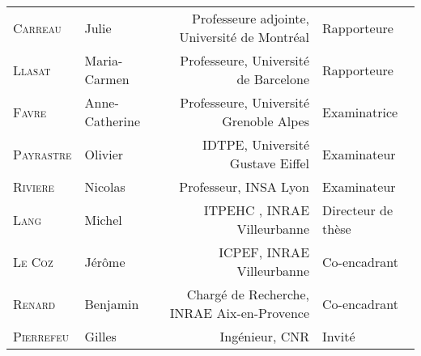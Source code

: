 \begin{adjustwidth}{-0.8cm}{}
\begin{center}
\noindent \normalsize 
\begin{tabular}{llrl}
    	\textsc{Carreau} & Julie & {\small Professeure adjointe}, Université de Montréal & Rapporteure\\
    	\textsc{Llasat} & Maria-Carmen & {\small Professeure}, Université de Barcelone & Rapporteure\\
    	\textsc{Favre}	& Anne-Catherine & {\small Professeure}, Université Grenoble Alpes & Examinatrice\\
      	\textsc{Payrastre} & Olivier & {\small IDTPE}, Université Gustave Eiffel & Examinateur\\
      	\textsc{Riviere} & Nicolas & {\small Professeur}, INSA Lyon & Examinateur\\
      	\textsc{Lang} & Michel &{\small ITPEHC }, INRAE Villeurbanne & Directeur de thèse \\
      	\textsc{Le Coz} & Jérôme & {\small ICPEF}, INRAE Villeurbanne & Co-encadrant\\
      	\textsc{Renard} & Benjamin&{\small Chargé de Recherche}, INRAE Aix-en-Provence& Co-encadrant\\
      	\textsc{Pierrefeu} & Gilles & {\small Ingénieur}, CNR & Invité \\
\end{tabular}
\end{center}
\end{adjustwidth}


\newpage
\thispagestyle{empty}

\restoregeometry

\vspace*{\fill}
%


\newpage



